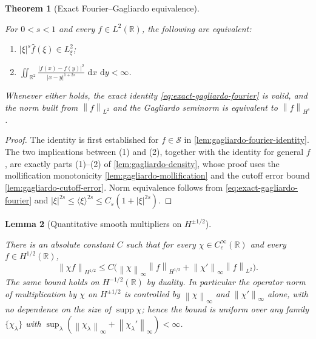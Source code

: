 \documentclass[11pt,oneside]{book}
\providecommand{\uses}[1]{}
\newtheorem{theorem}{Theorem}[chapter]
\newtheorem{lemma}[theorem]{Lemma}
\theoremstyle{definition}
\theoremstyle{remark}
\newcommand{\R}{\mathbb R}
\newcommand{\Ssch}{\mathcal S}
\newcommand{\supp}{\operatorname{supp}}
\newcommand{\1}{\mathbf 1}
\newcommand{\dd}{\,\mathrm d}
\newcommand{\norm}[1]{\left\lVert #1\right\rVert}
\newcommand{\abs}[1]{\left\lvert #1\right\rvert}
\begin{document}
\begin{theorem}[Exact Fourier--Gagliardo equivalence]\label{thm:fourier-gagliardo}
\uses{def:Hs-space}
For $0<s<1$ and every $f\in L^2(\R)$, the following are equivalent:
\begin{enumerate}
\item $\abs{\xi}^s\widehat f(\xi)\in L^2_\xi$;
\item $\displaystyle\iint_{\R^2}\frac{\abs{f(x)-f(y)}^2}{\abs{x-y}^{1+2s}}\,\dd x\,\dd y<\infty$.
\end{enumerate}
Whenever either holds, the exact identity
\eqref{eq:exact-gagliardo-fourier} is valid, and the norm built from
$\norm{f}_{L^2}$ and the Gagliardo seminorm is equivalent to
$\norm{f}_{H^{s}}$.
\end{theorem}

\begin{proof}
\uses{lem:gagliardo-fourier-identity, lem:gagliardo-mollification, lem:gagliardo-cutoff-error, lem:gagliardo-density}
The identity is first established for $f\in\Ssch$ in
\cref{lem:gagliardo-fourier-identity}. The two implications between (1) and (2),
together with the identity for general $f$, are exactly parts (1)--(2) of
\cref{lem:gagliardo-density}, whose proof uses the mollification monotonicity
\cref{lem:gagliardo-mollification} and the cutoff error bound
\cref{lem:gagliardo-cutoff-error}. Norm equivalence follows from
\eqref{eq:exact-gagliardo-fourier} and
$\abs{\xi}^{2s}\le\langle\xi\rangle^{2s}\le C_s(1+\abs{\xi}^{2s})$.
\end{proof}

\begin{lemma}[Quantitative smooth multipliers on $H^{\pm1/2}$]\label{lem:smooth-multiplier-quantitative}
\uses{def:Hs-space}
There is an absolute constant $C$ such that for every $\chi\in C_c^\infty(\R)$
and every $f\in H^{1/2}(\R)$,
\begin{equation}
 \norm{\chi f}_{H^{1/2}}
 \le C\big(\norm{\chi}_\infty\norm{f}_{H^{1/2}}
          +\norm{\chi'}_\infty\norm{f}_{L^2}\big).
 \label{eq:smooth-multiplier-quantitative}
\end{equation}
The same bound holds on $H^{-1/2}(\R)$ by duality. In particular the operator
norm of multiplication by $\chi$ on $H^{\pm1/2}$ is controlled by
$\norm{\chi}_\infty$ and $\norm{\chi'}_\infty$ alone, with no dependence on the
size of $\supp\chi$; hence the bound is uniform over any family
$\{\chi_\lambda\}$ with $\sup_\lambda(\norm{\chi_\lambda}_\infty+\norm{\chi_\lambda'}_\infty)<\infty$.
\end{lemma}
\end{document}
